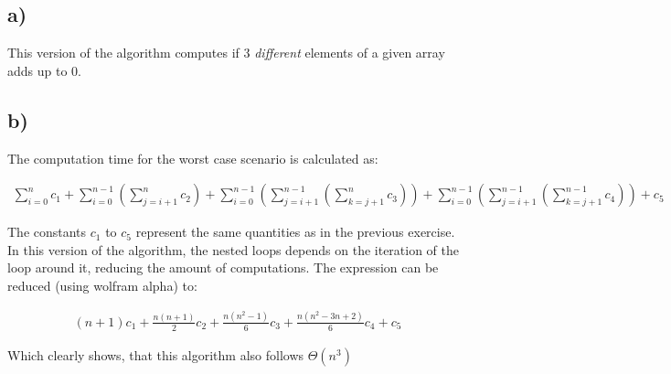\documentclass[11pt]{article}
\begin{document}
\subsection*{a)}
This version of the algorithm computes if 3 \textit{different} elements of a given array adds up to 0.

\subsection*{b)}
The computation time for the worst case scenario is calculated as:

\begin{gather*}
\sum_{i=0}^{n}c_1 + \sum_{i=0}^{n-1}\left(\sum_{j=i+1}^{n}c_2\right) + \sum_{i=0}^{n-1}\left(\sum_{j=i+1}^{n-1}\left(\sum_{k=j+1}^{n}c_3\right)\right) + \sum_{i=0}^{n-1}\left(\sum_{j=i+1}^{n-1}\left(\sum_{k=j+1}^{n-1}c_4\right)\right) + c_5
\end{gather*}

The constants $c_1$ to $c_5$ represent the same quantities as in the previous exercise.  \\

In this version of the algorithm, the nested loops depends on the iteration of the loop around it, reducing the amount of computations. The expression can be reduced (using wolfram alpha) to:

\begin{gather*}
(n+1)c_1 + \frac{n(n+1)}{2}c_2 + \frac{n(n^2-1)}{6}c_3 + \frac{n(n^2-3n+2)}{6}c_4 + c_5
\end{gather*}

Which clearly shows, that this algorithm also follows $\Theta(n^3)$
\end{document}
